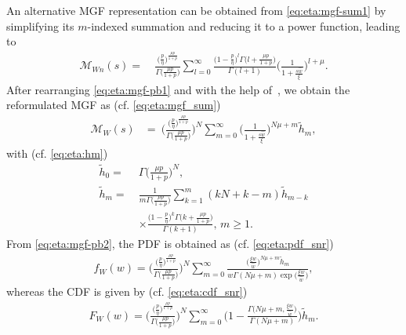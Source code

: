 \documentclass[journal,twocolumn]{IEEEtran}
\begin{document}
An alternative \ac{MGF} representation can be obtained from \eqref{eq:eta:mgf-sum1} by simplifying its $m$-indexed summation and reducing it to a power function, leading to 
\begin{align}
    \mathcal{M}_{W{n}}(s)= \ & \frac{\big(\frac{p}{\eta }\big)^{\frac{\mu  p}{1+p}}}{\Gamma \big(\frac{\mu  p}{1+p}\big)} \sum _{l=0}^{\infty } \frac{\big(1 \! - \! \frac{p}{\eta }\big)^l \Gamma \big(l \! + \! \frac{\mu  p}{1+p}\big)}{\Gamma (l+1)} \Bigg(\frac{1 }{1 \! + \! \frac{s \hat{w}}{\xi} }\Bigg)^{l+\mu }. \label{eq:eta:mgf-pb1}
\end{align}
After rearranging \eqref{eq:eta:mgf-pb1} and with the help of~\cite[Eq.~(0.314)]{Gra07}, we obtain the reformulated \ac{MGF} as (cf. \eqref{eq:eta:mgf_sum})
\begin{align} \label{eq:eta:mgf-pb2}
        \mathcal{M}_{W}(s)&= \ \Bigg(\frac{\big(\frac{p}{\eta }\big)^{\frac{\mu  p}{1+p}}}{\Gamma \big(\frac{\mu  p}{1+p}\big)}\Bigg)^{N} \sum _{m=0}^{\infty } \Bigg(\frac{1 }{1 +\frac{s \hat{w}}{\xi} }\Bigg)^{N\mu +m } \tilde{h}_m,
\end{align}
with (cf. \eqref{eq:eta:hm})
\begin{subequations} \label{eq:eta:hm:pb}
\begin{align}
    \tilde{h}_0 = \ & \Gamma \bigg(\frac{\mu  p}{1+p}\bigg)^N, \label{eq:eta:hm0:pb} \\
    \tilde{h}_m = \ & \frac{1}{m \Gamma \big(\frac{\mu  p}{1+p}\big)} \sum _{k=1}^m (k N+k-m) \tilde{h}_{m-k} \nonumber \\
    & \times \frac{\big(1-\frac{p}{\eta }\big)^k \Gamma \big(k+\frac{\mu p }{1+p}\big)}{\Gamma (k+1)}, \, m\geq 1. \label{eq:eta:hm1:pb}
\end{align}
\end{subequations}
From \eqref{eq:eta:mgf-pb2}, the PDF is obtained as (cf. \eqref{eq:eta:pdf_snr})
\begin{align} \label{eq:eta:pdf_snr2}
        f_{W}(w) = \Bigg(\frac{\big(\frac{p}{\eta }\big)^{\frac{\mu  p}{1+p}}}{\Gamma \big(\frac{\mu  p}{1+p}\big)}\Bigg)^{N}  \sum_{m=0}^{\infty}\frac{ \big(\frac{\xi w}{\hat{w}}\big)^{N \mu + m} \tilde{h}_m}{ w \Gamma (N \mu + m ) \exp\big(\frac{\xi w}{\hat{w}}\big)},
\end{align}
whereas the CDF is given by (cf. \eqref{eq:eta:cdf_snr})
\begin{align} \label{eq:eta:cdf_snr2}
        F_{W}(w) = \Bigg(\frac{\big(\frac{p}{\eta }\big)^{\frac{\mu  p}{1+p}}}{\Gamma \big(\frac{\mu  p}{1+p}\big)}\Bigg)^{N}\sum_{m=0}^{\infty}\Bigg(1-\frac{ \Gamma \big(N \mu + m,\frac{ \xi w}{\hat{w} }\big)}{ \Gamma (N \mu + m )}\Bigg)\tilde{h}_m.
\end{align}
\end{document}
